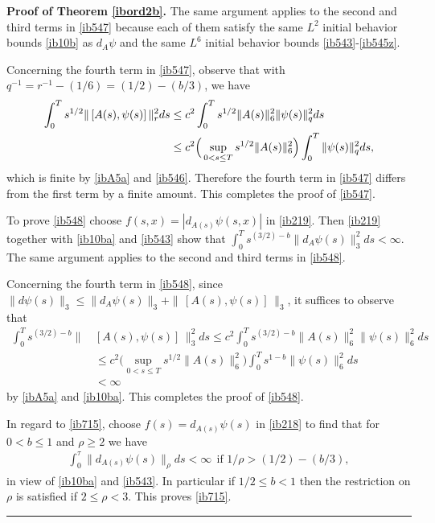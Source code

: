 \documentclass[12pt]{article}
\newenvironment{proof}[1][Proof]{\textbf{#1.} }{\ \rule{0.5em}{0.5em}}
\def \({\Big(}
\def \){\Big)}
\def \eref{\eqref}
\numberwithin{equation}{section}
\begin{document}
\begin{proof}[Proof of Theorem \ref{ibord2b}]
            The same argument applies to the second and third terms in \eref{ib547}
          because each of them satisfy the same $L^2$ initial behavior bounds \eref{ib10b} 
           as $d_A\psi$ and the same $L^6$ initial behavior bounds \eref{ib543}-\eref{ib545z}. 
          
           Concerning the fourth term in \eref{ib547}, observe that with 
        $q^{-1} = r^{-1} - (1/6) = (1/2) - (b/3)$, we have
        \begin{align}
        \int_0^T s^{1/2} \|\, [ A(s),\psi(s)]\, \|_r^2 ds&\le c^2 \int_0^T s^{1/2} \| A(s)\|_6^2 \|\psi(s)\|_q^2 ds \notag\\
        &\le c^2 \(\sup_{0 < s \le T}s^{1/2} \| A(s)\|_6^2\)\int_0^T \|\psi(s)\|_q^2 ds, \notag
        \end{align}
        which is finite by \eref{ibA5a} and \eref{ib546}. Therefore the fourth term in \eref{ib547} 
        differs from the first term  by a finite amount.  This completes the proof of \eref{ib547}.
                
               To prove \eref{ib548} choose $f(s,x) = |d_{A(s)} \psi(s,x)|$ in \eref{ib219}. Then \eref{ib219}
        together with \eref{ib10ba} and \eref{ib543} show that 
        $\int_0^T s^{(3/2) - b} \| d_A\psi(s)\|_3^2 ds < \infty$. 
        The same argument applies to the second and third terms in \eref{ib548}.
        
 
               Concerning the fourth term in \eref{ib548},  
 since $\| d\psi(s)\|_3 \le \| d_A \psi(s)\|_3 + \|\, [A(s), \psi(s)]\,\|_3$, it suffices 
 to observe that 
  \begin{align*}
  \int_0^T s^{(3/2) - b} \|\, &[A(s), \psi(s)]\,\|_3^2 ds \le c^2 \int_0^T   s^{(3/2) - b} \|A(s)\|_6^2 \|\psi(s)\|_6^2ds \\
  &\le c^2 \(\sup_{0< s \le T} s^{1/2} \|A(s)\|_6^2\) \int_0^T s^{1-b} \|\psi(s)\|_6^2 ds \\
  &<\infty
  \end{align*}     
  by \eref{ibA5a} and \eref{ib10ba}. This completes the proof of \eref{ib548}.  
  
  In regard to \eref{ib715},  choose  $f(s) = d_{A(s)} \psi(s)$ in \eref{ib218} to find that for $0 < b \le 1$
  and $\rho \ge 2$  we have 
\begin{align}
\int_0^\tau \|  d_{A(s)} \psi(s)\|_\rho ds < \infty\ \ \text{if $1/\rho > (1/2) - (b/3)$},   \label{rec715a}
\end{align}
 in view of \eref{ib10ba} and \eref{ib543}. In particular if  $ 1/2 \le b <1$ then the restriction on $\rho$
 is satisfied if $ 2 \le \rho < 3$. This proves \eref{ib715}. 
        \end{proof}
\end{document}
